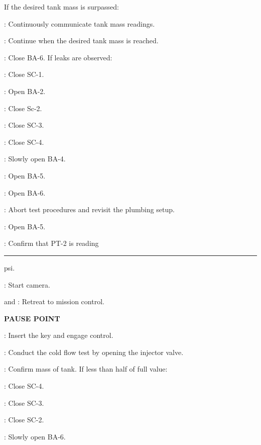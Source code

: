 \begin{checklist}
    \item If the desired tank mass is surpassed:
    \begin{checklist}
            \item \daq{}: Continuously communicate tank mass readings. 
            \item \ops{}: Continue when the desired tank mass is reached.
    \end{checklist}
    \item \primary{}: Close BA-6.
    If leaks are observed:
    \begin{checklist}
            \item \primary{}: Close SC-1.
            \item \primary{}: Open BA-2.
            \item \primary{}: Close Sc-2.
            \item \primary{}: Close SC-3.
            \item \primary{}: Close SC-4. 
            \item \primary{}: Slowly open BA-4.
            \item \primary{}: Open BA-5. 
            \item \primary{}: Open BA-6. 
            \item \ops{}: Abort test procedures and revisit the plumbing setup. 
    \end{checklist}
    \item \primary{}: Open BA-5.
    \item \daq{}: Confirm that PT-2 is reading \rule{5em}{0.4pt} psi.
    \item \primary{}: Start camera. 
    \item \primary{} and \secondary{}: Retreat to mission control.
    \item \textbf{PAUSE POINT}
    \item \control{}: Insert the key and engage control. 
    \item \control{}: Conduct the cold flow test by opening the injector valve.
    \item \ops{}: Confirm mass of tank. If less than half of full value:
    \begin{checklist}
            \item \primary{}: Close SC-4.
            \item \primary{}: Close SC-3.
            \item \primary{}: Close SC-2.
            \item \primary{}: Slowly open BA-6.

\end{checklist}
\end{checklist}
